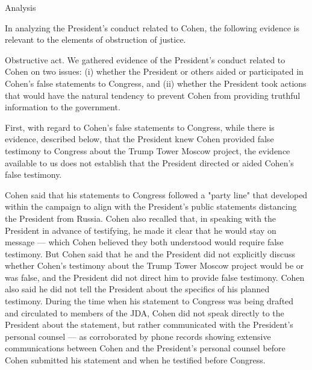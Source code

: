 Analysis

In analyzing the President's conduct related to Cohen, the following evidence is relevant to the elements of obstruction of justice.

Obstructive act.
We gathered evidence of the President's conduct related to Cohen on two issues:
(i) whether the President or others aided or participated in Cohen's false statements to Congress, and
(ii) whether the President took actions that would have the natural tendency to prevent Cohen from providing truthful information to the government.

First, with regard to Cohen's false statements to Congress, while there is evidence, described below, that the President knew Cohen provided false testimony to Congress about the Trump Tower Moscow project, the evidence available to us does not establish that the President directed or aided Cohen's false testimony.

Cohen said that his statements to Congress followed a "party line" that developed within the campaign to align with the President's public statements distancing the President from Russia.
Cohen also recalled that, in speaking with the President in advance of testifying, he made it clear that he would stay on message — which Cohen believed they both understood would require false testimony.
But Cohen said that he and the President did not explicitly discuss whether Cohen's testimony about the Trump Tower Moscow project would be or was false, and the President did not direct him to provide false testimony.
Cohen also said he did not tell the President about the specifics of his planned testimony.
During the time when his statement to Congress was being drafted and circulated to members of the JDA, Cohen did not speak directly to the President about the statement, but rather communicated with the President's personal counsel — as corroborated by phone records showing extensive communications between Cohen and the President's personal counsel before Cohen submitted his statement and when he testified before Congress.

